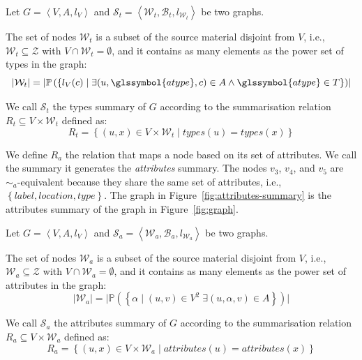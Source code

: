 \begin{definition}
	Let $G=\left\langle V, A, l_V \right\rangle$ and $\mathcal{S}_t = \left\langle \mathcal{W}_t, \mathcal{B}_t, l_{\mathcal{W}_t} \right\rangle$ be two graphs.

	The set of nodes $\mathcal{W}_t$ is a subset of the source material disjoint from $V$, i.e., $\mathcal{W}_t \subseteq \mathcal{Z}$ with $V \cap \mathcal{W}_t = \emptyset$, and it contains as many elements as the power set of types in the graph:
	$$
	\lvert \mathcal{W}_t \rvert = \lvert \mathbb{P}\left( \left\lbrace l_V(c) \mid \exists (u, \glssymbol{atype}, c) \in A \wedge \glssymbol{atype} \in T \right\rbrace \right) \rvert
	$$

	We call $\mathcal{S}_t$ the types summary of $G$ according to the summarisation relation $R_t \subseteq V \times \mathcal{W}_t$ defined as:
	$$
	R_t = \left\lbrace (u, x) \in V \times \mathcal{W}_t \mid types(u) = types(x) \right\rbrace
	$$
	\label{def:t}
\end{definition}
\vspace{.5cm}


We define $R_a$ the relation that maps a node based on its set of attributes. We call the summary it generates the \emph{attributes} summary.
The nodes $v_3$, $v_4$, and $v_5$ are $\sim_a$-equivalent because they share the same set of attributes, i.e., $\left\lbrace label, location, type \right\rbrace$. The graph in Figure~\ref{fig:attributes-summary} is the attributes summary of the graph in Figure~\ref{fig:graph}.

\begin{definition}
	Let $G=\left\langle V, A, l_V \right\rangle$ and $\mathcal{S}_a = \left\langle \mathcal{W}_a, \mathcal{B}_a, l_{\mathcal{W}_a} \right\rangle$ be two graphs.

	The set of nodes $\mathcal{W}_a$ is a subset of the source material disjoint from $V$, i.e., $\mathcal{W}_a \subseteq \mathcal{Z}$ with $V \cap \mathcal{W}_a = \emptyset$, and it contains as many elements as the power set of attributes in the graph:
	$$
	\lvert \mathcal{W}_a \rvert = \lvert \mathbb{P}\left( \left\lbrace \alpha \mid (u, v) \in V^2\; \exists (u, \alpha, v) \in A \right\rbrace \right) \rvert
	$$

	We call $\mathcal{S}_a$ the attributes summary of $G$ according to the summarisation relation $R_a \subseteq V \times \mathcal{W}_a$ defined as:
	$$
	R_a = \left\lbrace (u, x) \in V \times \mathcal{W}_a \mid attributes(u) = attributes(x) \right\rbrace
	$$
	\label{def:a}
\end{definition}

